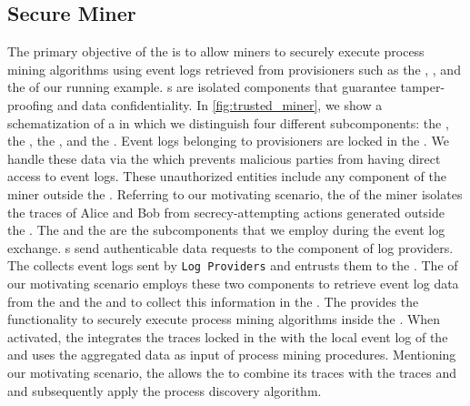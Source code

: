 \subsection{Secure Miner}
The primary objective of the  is to allow miners to securely execute process mining algorithms using event logs retrieved from provisioners such as the , , and the  of our running example. s are isolated components that guarantee tamper-proofing and data confidentiality. In \cref{fig:trusted_miner}, we show a schematization of a  in which we distinguish four different subcomponents: the , the , the , and the . Event logs belonging to provisioners are locked in the . We handle these data via the  which prevents malicious parties from having direct access to event logs. These unauthorized entities include any component of the miner  outside the . Referring to our motivating scenario, the  of the miner isolates the traces of Alice and Bob from secrecy-attempting actions generated outside the . %
The  and the  are the subcomponents that we employ during the event log exchange. s send authenticable data requests to the  component of log providers. The  collects event logs sent by \texttt{Log Providers} and entrusts them to the . The  of our motivating scenario employs these two components to retrieve event log data from the  and the  and to collect this information in the . The  provides the functionality to securely execute process mining algorithms inside the . When activated, the  integrates the traces locked in the  with the local event log of the  and uses the aggregated data as input of process mining procedures. Mentioning our motivating scenario, the  allows the  to combine its traces with the traces  and  and subsequently apply the process discovery algorithm.



